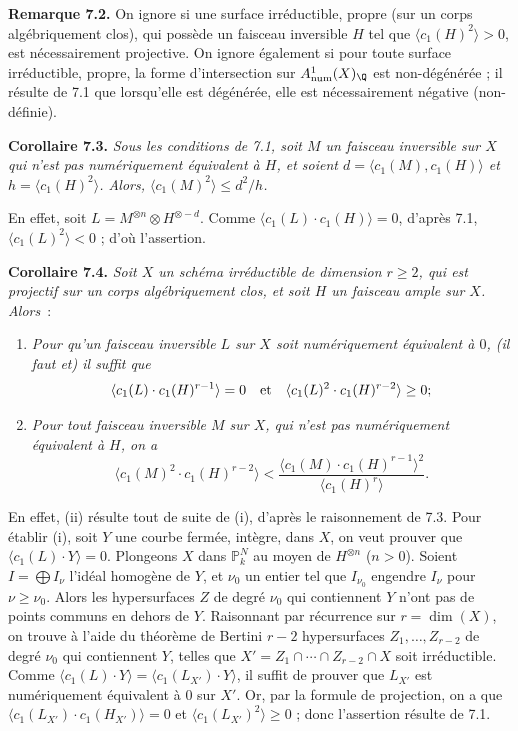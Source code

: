 \textbf{Remarque 7.2.} On ignore si une surface irr\'eductible, propre (sur un corps alg\'ebriquement clos), qui poss\`ede un faisceau inversible $H$ tel que $\langle c_1(H)^2\rangle>0$, est n\'ecessairement projective. On ignore \'egalement si pour toute surface irr\'eductible, propre, la forme d'intersection sur $A^1_{\mathrm{num}}(X)_{\Q}$ est non-d\'eg\'en\'er\'ee ; il r\'esulte de 7.1 que lorsqu'elle est d\'eg\'en\'er\'ee, elle est n\'ecessairement n\'egative (non-d\'efinie).

\textbf{Corollaire 7.3.} \emph{Sous les conditions de 7.1, soit $M$ un faisceau inversible sur $X$ qui n'est pas num\'eriquement \'equivalent \`a $H$, et soient $d=\langle c_1(M),c_1(H)\rangle$ et $h=\langle c_1(H)^2\rangle$. Alors, $\langle c_1(M)^2\rangle\leq d^2/h$.}

En effet, soit $L=M^{\otimes n}\otimes H^{\otimes -d}$. Comme $\langle c_1(L)\cdot c_1(H)\rangle=0$, d'apr\`es 7.1, $\langle c_1(L)^2\rangle<0$ ; d'o\`u l'assertion.

\textbf{Corollaire 7.4.} \emph{Soit $X$ un sch\'ema irr\'eductible de dimension $r\geq2$, qui est projectif sur un corps alg\'ebriquement clos, et soit $H$ un faisceau ample sur $X$. Alors}~:
\begin{enumerate}[label=(\roman*)]
\item \emph{Pour qu'un faisceau inversible $L$ sur $X$ soit num\'eriquement \'equivalent \`a $0$, (il faut et) il suffit que}
\[
   \langle c_1(L)\cdot c_1(H)^{r-1}\rangle=0
   \quad\hbox{et}\quad
   \langle c_1(L)^2\cdot c_1(H)^{r-2}\rangle\geq0;
\]
\item \emph{Pour tout faisceau inversible $M$ sur $X$, qui n'est pas num\'eriquement \'equivalent \`a $H$, on a}
\[
   \langle c_1(M)^2\cdot c_1(H)^{r-2}\rangle
   <
   \frac{\langle c_1(M)\cdot c_1(H)^{r-1}\rangle^2}
        {\langle c_1(H)^r\rangle}.
\]
\end{enumerate}
En effet, (ii) r\'esulte tout de suite de (i), d'apr\`es le raisonnement de 7.3. Pour \'etablir (i), soit $Y$ une courbe ferm\'ee, int\`egre, dans $X$, on veut prouver que $\langle c_1(L)\cdot Y\rangle=0$. Plongeons $X$ dans $\mathbb P^N_k$ au moyen de $H^{\otimes n}$ ($n>0$). Soient $I=\bigoplus I_\nu$ l'id\'eal homog\`ene de $Y$, et $\nu_0$ un entier tel que $I_{\nu_0}$ engendre $I_\nu$ pour $\nu\geq\nu_0$. Alors les hypersurfaces $Z$ de degr\'e $\nu_0$ qui contiennent $Y$ n'ont pas de points communs en dehors de $Y$. Raisonnant par r\'ecurrence sur $r=\dim(X)$, on trouve \`a l'aide du th\'eor\`eme de Bertini $r-2$ hypersurfaces $Z_1,\ldots,Z_{r-2}$ de degr\'e $\nu_0$ qui contiennent $Y$, telles que $X'=Z_1\cap\cdots\cap Z_{r-2}\cap X$ soit irr\'eductible. Comme $\langle c_1(L)\cdot Y\rangle=\langle c_1(L_{X'})\cdot Y\rangle$, il suffit de prouver que $L_{X'}$ est num\'eriquement \'equivalent \`a $0$ sur $X'$. Or, par la formule de projection, on a que $\langle c_1(L_{X'})\cdot c_1(H_{X'})\rangle=0$ et $\langle c_1(L_{X'})^2\rangle\geq0$ ; donc l'assertion r\'esulte de 7.1.

